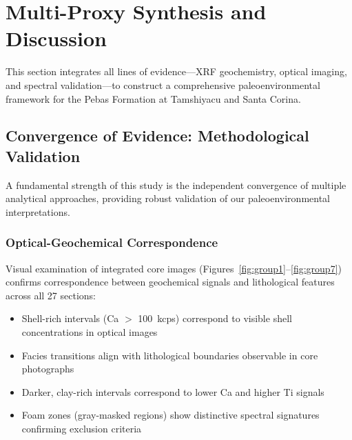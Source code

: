 \documentclass[11pt,a4paper]{article}
\begin{document}


\section{Multi-Proxy Synthesis and Discussion}

This section integrates all lines of evidence---XRF geochemistry, optical imaging, and spectral validation---to construct a comprehensive paleoenvironmental framework for the Pebas Formation at Tamshiyacu and Santa Corina.

\subsection{Convergence of Evidence: Methodological Validation}

A fundamental strength of this study is the independent convergence of multiple analytical approaches, providing robust validation of our paleoenvironmental interpretations.

\subsubsection{Optical-Geochemical Correspondence}

Visual examination of integrated core images (Figures~\ref{fig:group1}--\ref{fig:group7}) confirms correspondence between geochemical signals and lithological features across all 27 sections:

\begin{itemize}
    \item Shell-rich intervals (Ca $>$ 100~kcps) correspond to visible shell concentrations in optical images
    \item Facies transitions align with lithological boundaries observable in core photographs
    \item Darker, clay-rich intervals correspond to lower Ca and higher Ti signals
    \item Foam zones (gray-masked regions) show distinctive spectral signatures confirming exclusion criteria
\end{itemize}
\end{document}
